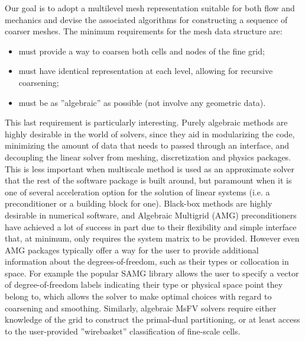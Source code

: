 Our goal is to adopt a multilevel mesh representation suitable for both flow and mechanics and devise the associated algorithms for constructing a sequence of coarser meshes.   The minimum requirements for the mesh data structure are:
\begin{itemize}
    \item must provide a way to coarsen both cells and nodes of the fine grid;
    \item must have identical representation at each level, allowing for recursive coarsening;
    \item must be as ''algebraic'' as possible (not involve any geometric data).
\end{itemize}
This last requirement is particularly interesting.   Purely algebraic methods are highly desirable in the world of solvers, since they aid in modularizing the code, minimizing the amount of data that needs to passed through an interface, and decoupling the linear solver from meshing, discretization and physics packages.   This is less important when multiscale method is used as an approximate solver that the rest of the software package is built around, but paramount when it is one of several acceleration option for the solution of linear systems (i.e. a preconditioner or a building block for one).   Black-box methods are highly desirable in numerical software, and Algebraic Multigrid (AMG) preconditioners have achieved a lot of success in part due to their flexibility and simple interface that, at minimum, only requires the system matrix to be provided.   However even AMG packages typically offer a way for the user to provide additional information about the degrees-of-freedom, such as their types or collocation in space. For example the popular SAMG \cite{?} library allows the user to specify a vector of degree-of-freedom labels indicating their type or physical space point they belong to, which allows the solver to make optimal choices with regard to coarsening and smoothing.   Similarly, algebraic MsFV solvers require either knowledge of the grid to construct the primal-dual partitioning, or at least access to the user-provided ''wirebasket'' classification of fine-scale cells.

